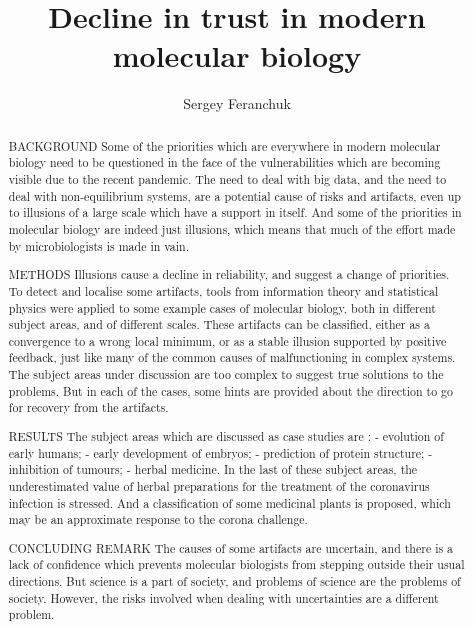 \documentclass[12pt,aps]{revtex4}
\begin{document}
\title{Decline in trust in modern molecular biology}
\author{Sergey Feranchuk}
\noaffiliation
{}

\begin{abstract}
BACKGROUND   Some of the priorities which are everywhere in modern molecular biology need to be questioned in the face of the vulnerabilities which are becoming visible due to the recent pandemic. The need to deal with big data, and the need to deal with non-equilibrium systems, are a potential cause of risks and artifacts, even up to illusions of a large scale which have a support in itself. And some of the priorities in molecular biology are indeed just illusions, which means that much of the effort made by microbiologists is made in vain.

METHODS   Illusions cause a decline in reliability, and suggest a change of priorities. To detect and localise some artifacts, tools from information theory and statistical physics were applied to some example cases of molecular biology, both in different subject areas, and of different scales. These artifacts can be classified, either as a convergence to a wrong local minimum, or as a stable illusion supported by positive feedback, just like many of the common causes of malfunctioning in complex systems.  The subject areas under discussion are too complex to suggest true solutions to the problems. But in each of the cases, some hints are provided about the direction to go for recovery from the artifacts.

RESULTS   The subject areas which are discussed as case studies are : - evolution of early humans; - early development of embryos; - prediction of protein structure; - inhibition of tumours; - herbal medicine. In the last of these subject areas, the underestimated value of herbal preparations for the treatment of the coronavirus infection is stressed. And a classification of some medicinal plants is proposed, which may be an approximate response to the corona challenge.

CONCLUDING REMARK  The causes of some artifacts are uncertain, and there is a lack of confidence which prevents molecular biologists from stepping outside their usual directions. But science is a part of society, and problems of science are the problems of society. However, the risks involved when dealing with uncertainties are a different problem.

\end{abstract}

\maketitle
\end{document}
